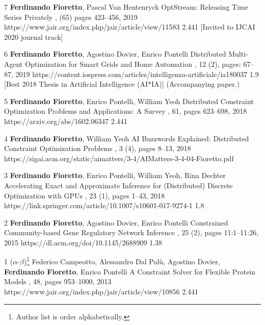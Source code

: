 \begin{pubs}
	\journalentryIFAwd
	{7}	%
	{{\bf Ferdinando Fioretto}, Pascal Van Hentenryck}
	{OptStream: Releasing Time Series Privately}
	{\JAIR, (65) pages 423--456, 2019}
	{https://www.jair.org/index.php/jair/article/view/11583}
	{2.441}
	{[Invited to IJCAI 2020 journal track]}
	{}
	
	\journalentryIFAwd
	{6}	%
	{{\bf Ferdinando Fioretto}, Agostino Dovier, Enrico Pontelli}
	{Distributed Multi-Agent Optimization for Smart Grids and Home Automation}
	{,  12 (2), pages: 67--87, 2019}
	{https://content.iospress.com/articles/intelligenza-artificiale/ia180037}
	{1.9}
	{[Best 2018 Thesis in Artificial Intelligence (AI*IA)]}
	{(Accompanying paper.)}

	\journalentryIF
	{5}	%
	{{\bf Ferdinando Fioretto}, Enrico Pontelli, William Yeoh}
	{Distributed Constraint Optimization Problems and Applications: A Survey}
	{\JAIR, 61, pages 623--698, 2018} 
	{https://arxiv.org/abs/1602.06347}
	{2.441}


	\journalentry
	{4}	%
	{{\bf Ferdinando Fioretto}, William Yeoh}
	{AI Buzzwords Explained: Distributed Constraint Optimization Problems}
	{, 3 (4), pages 8--13, 2018}
	{https://sigai.acm.org/static/aimatters/3-4/AIMatters-3-4-04-Fioretto.pdf}
	

	\journalentryIF
	{3}	%
	{{\bf Ferdinando Fioretto}, Enrico Pontelli, William Yeoh, Rina Dechter}
	{Accelerating Exact and Approximate Inference for (Distributed) Discrete Optimization with GPUs}
	{, 23 (1), pages 1--43, 2018}
	{https://link.springer.com/article/10.1007/s10601-017-9274-1}
	{1.8}

	\journalentryIF
	{2}	%
	{{\bf Ferdinando Fioretto}, Agostino Dovier, Enrico Pontelli}
	{Constrained Community-based Gene Regulatory Network Inference}
	{, 25 (2), pages 11:1--11:26, 2015}
	{https://dl.acm.org/doi/10.1145/2688909}
	{1.38}

	\journalentryIF
	{1}	%
	{($\alpha$-$\beta$)\footnote{Author list is order alphabetically.} 
		Federico Campeotto, Alessandro Dal Pal\`{u}, Agostino Dovier,  {\bf Ferdinando Fioretto}, Enrico Pontelli}
	{A Constraint Solver for Flexible Protein Models}
	{\JAIR, 48, pages 953--1000, 2013}
	{https://www.jair.org/index.php/jair/article/view/10856}
	{2.441}
\end{pubs}


